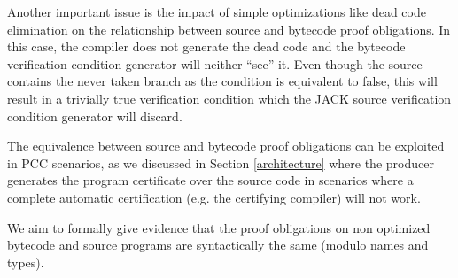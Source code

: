 Another important issue is the impact of simple optimizations like dead code elimination on the relationship between source and bytecode proof obligations. 
In this case, the compiler does not generate the dead code and the bytecode verification condition generator will neither ``see'' it. 
Even though the source contains the never taken branch as the condition is equivalent to false, this will result in a trivially true
verification condition which the JACK source verification condition generator will discard.

The equivalence between source and bytecode proof obligations can be exploited in PCC scenarios, as we discussed in Section \ref{architecture} where 
the producer generates the program certificate over the source code in scenarios where a complete automatic certification (e.g. the certifying compiler) will not work.
 
We aim to formally give evidence that the proof obligations on non optimized bytecode and source programs are syntactically the same (modulo names and types). 






%
%
%
%
%
%
%
%
%

